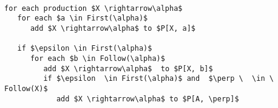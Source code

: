 \documentclass[
    border=0.2cm,
    convert={density=600}
]{standalone}
\begin{document}
\begin{lstlisting}[mathescape,backgroundcolor=\color{lightgray},basicstyle=\scriptsize\ttfamily]

for each production $X \rightarrow\alpha$
   for each $a \in First(\alpha)$
      add $X \rightarrow\alpha$ to $P[X, a]$
   
   if $\epsilon \in First(\alpha)$
      for each $b \in Follow(\alpha)$
         add $X \rightarrow\alpha$  to $P[X, b]$
         if $\epsilon  \in First(\alpha)$ and  $\perp \  \in \ Follow(X)$
            add $X \rightarrow\alpha$ to $P[A, \perp]$            
            
\end{lstlisting}
\end{document}
